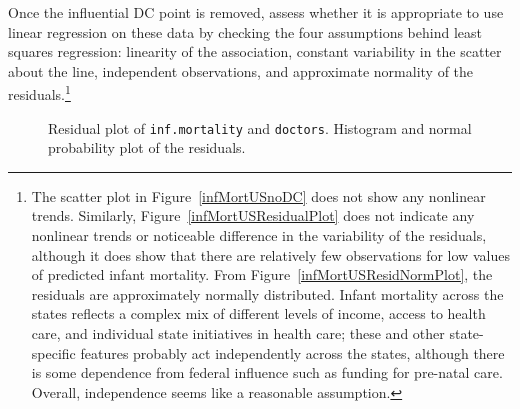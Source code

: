 \begin{exercise}Once the influential DC point is removed, assess whether it is appropriate to use linear regression on these data by checking the four assumptions behind least squares regression: linearity of the association, constant variability in the scatter about the line, independent observations, and approximate normality of the residuals.\footnote{The scatter plot in Figure~\ref{infMortUSnoDC} does not show any nonlinear trends. Similarly, Figure~\ref{infMortUSResidualPlot} does not indicate any nonlinear trends or noticeable difference in the variability of the residuals, although it does show that there are relatively few observations for low values of predicted infant mortality. From Figure~\ref{infMortUSResidNormPlot}, the residuals are approximately normally distributed. Infant mortality across the states reflects a complex mix of different levels of income, access to health care, and individual state initiatives in health care; these and other state-specific features probably act independently across the states, although there is some dependence from federal influence such as funding for pre-natal care. Overall, independence seems like a reasonable assumption.} 

\begin{figure}[h]
	\centering
	\caption{ Residual plot of \texttt{inf.mortality} and \texttt{doctors}.  Histogram and normal probability plot of the residuals.}
	\label{infMortUSResid}
\end{figure}

\label{exampleInfantMortalityAssumptions}
\end{exercise}

